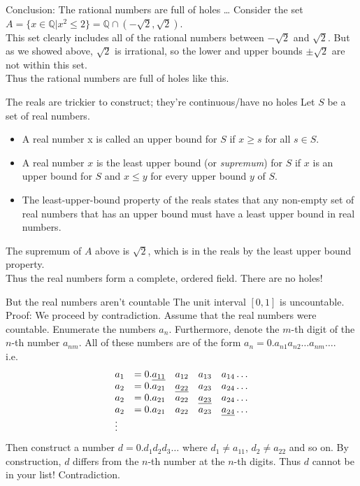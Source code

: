 \documentclass{beamer}
\begin{document}
\begin{frame}{Conclusion: The rational numbers are full of holes \ldots}
Consider the set\\
$A = \{ x \in \mathbb{Q} | x^2 \leq 2 \} = \mathbb{Q} \cap (-\sqrt{2}, \sqrt{2})$.\\
This set clearly includes all of the rational numbers between $-\sqrt{2}$ and $\sqrt{2}$. But as we showed above, $\sqrt{2}$
is irrational, so the lower and upper bounds $\pm\sqrt{2}$ are not within this set.\\
Thus the rational numbers are full of holes like this.
\end{frame}

\begin{frame}{The reals are trickier to construct; they're continuous/have no holes}
Let $S$ be a set of real numbers.
\begin{itemize}
\item A real number x is called an upper bound for $S$ if $x \geq s$ for all $s \in S$. \\
\item A real number $x$ is the least upper bound (or \emph{supremum}) for $S$ if $x$ is an upper bound for $S$ and $x \leq y$ for every upper bound $y$ of $S$.\\
\item The least-upper-bound property of the reals states that any non-empty set of real numbers that has an upper bound must have a least upper bound in real numbers.
\end{itemize}
The supremum of $A$ above is $\sqrt{2}$, which is in the reals by the least upper bound property.\\
Thus the real numbers form a complete, ordered field. There are no holes!
\end{frame}

\begin{frame}{But the real numbers aren't countable}
The unit interval $[0, 1]$ is uncountable. \\
Proof:
We proceed by contradiction. Assume that the real numbers were countable.
Enumerate the numbers $a_n$. Furthermore, denote the $m$-th digit of the $n$-th number $a_{nm}.$
All of these numbers are of the form $a_n = 0.a_{n1} a_{n2} \ldots a_{nm} \ldots$.
\\
i.e.
\begin{equation*}
\begin{array}{llllll}
a_{1} &= 0.\emph{a_{11}} &a_{12} &a_{13} &a_{14} \ldots \\
a_{2} &= 0.a_{21} &\emph{a_{22}} &a_{23} &a_{24} \ldots \\
a_{2} &= 0.a_{21} &a_{22} &\emph{a_{23}} &a_{24} \ldots \\
a_{2} &= 0.a_{21} &a_{22} &a_{23} &\emph{a_{24}} \ldots \\
\vdots
\end{array}
\end{equation*}
Then construct a number $d = 0.d_1 d_2 d_3 \ldots$ where $d_1 \ne a_{11}$, $d_2 \ne a_{22}$ and
so on. By construction, $d$ differs from the $n$-th number at the $n$-th digits. Thus $d$ cannot be in your
list! Contradiction.
\end{frame}
\end{document}

